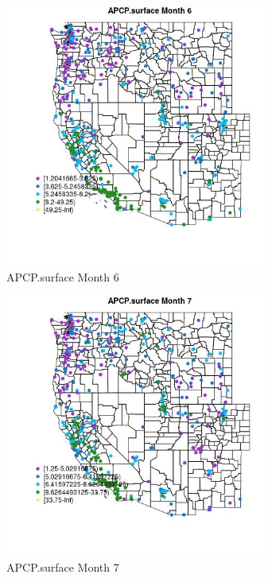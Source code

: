 \begin{figure} 
\centering  
\includegraphics[width=0.77\textwidth]{Code_Outputs/ML_input_report_ML_input_PM25_Step5_part_d_de_duplicated_aves_ML_input_MapObsMo6APCPsurface.jpg} 
\caption{\label{fig:ML_input_report_ML_input_PM25_Step5_part_d_de_duplicated_aves_ML_inputMapObsMo6APCPsurface}APCP.surface Month 6} 
\end{figure} 
 

\begin{figure} 
\centering  
\includegraphics[width=0.77\textwidth]{Code_Outputs/ML_input_report_ML_input_PM25_Step5_part_d_de_duplicated_aves_ML_input_MapObsMo7APCPsurface.jpg} 
\caption{\label{fig:ML_input_report_ML_input_PM25_Step5_part_d_de_duplicated_aves_ML_inputMapObsMo7APCPsurface}APCP.surface Month 7} 
\end{figure} 
 

